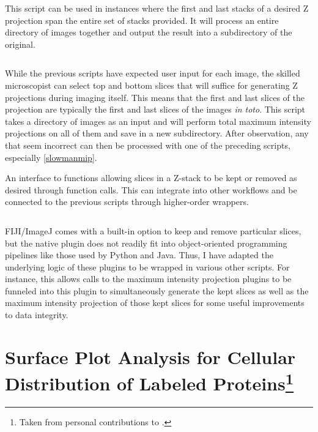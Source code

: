 \begin{code}
\caption{This script can be used in instances where the first and last stacks of a desired Z projection span the entire set of stacks provided. It will process an entire directory of images together and output the result into a subdirectory of the original.}
\label{bulkmip}

\inputminted[breaklines,frame=single,fontsize=\small]{python}{source/bulkMIPper.py}

\end{code}

While the previous scripts have expected user input for each image, the skilled microscopist can select top and bottom slices that will suffice for generating Z projections during imaging itself. This means that the first and last slices of the projection are typically the first and last slices of the images \textit{in toto}. This script takes a directory of images as an input and will perform total maximum intensity projections on all of them and save in a new subdirectory. After observation, any that seem incorrect can then be processed with one of the preceding scripts, especially \autoref{slowmanmip}. 

\begin{code}
\caption{An interface to functions allowing slices in a Z-stack to be kept or removed as desired through function calls. This can integrate into other workflows and be connected to the previous scripts through higher-order wrappers.}
\label{reslicer}

\inputminted[breaklines,frame=single,fontsize=\small]{python}{source/reSlicer.py}

\end{code}

FIJI/ImageJ comes with a built-in option to keep and remove particular slices, but the native plugin does not readily fit into object-oriented programming pipelines like those used by Python and Java. Thus, I have adapted the underlying logic of these plugins to be wrapped in various other scripts. For instance, this allows calls to the maximum intensity projection plugins to be funneled into this plugin to simultaneously generate the kept slices as well as the maximum intensity projection of those kept slices for some useful improvements to data integrity. 

\section[Surface Plot Analysis for Cellular Distribution of Labeled Proteins]{Surface Plot Analysis for Cellular Distribution of Labeled Proteins\footnote{Taken from personal contributions to \citet{Saelens2022}.}}

